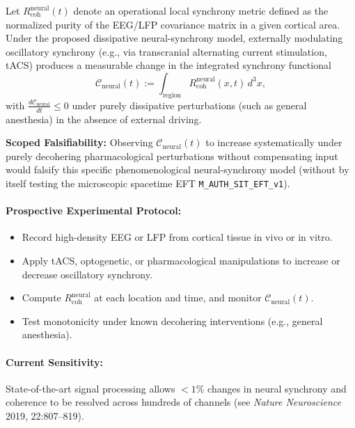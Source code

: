 \begin{prediction}
Let $R_{\mathrm{coh}}^{\mathrm{neural}}(t)$ denote an operational local synchrony metric defined as the normalized purity of the EEG/LFP covariance matrix in a given cortical area. Under the proposed dissipative neural-synchrony model, externally modulating oscillatory synchrony (e.g., via transcranial alternating current stimulation, tACS) produces a measurable change in the integrated synchrony functional
\[
\mathcal{C}_{\mathrm{neural}}(t) := \int_{\text{region}} R_{\mathrm{coh}}^{\mathrm{neural}}(x, t)\, d^3x,
\]
with $\frac{d \mathcal{C}_{\mathrm{neural}}}{dt} \leq 0$ under purely dissipative perturbations (such as general anesthesia) in the absence of external driving.

\textbf{Scoped Falsifiability:} Observing $\mathcal{C}_{\mathrm{neural}}(t)$ to increase systematically under purely decohering pharmacological perturbations without compensating input would falsify this specific phenomenological neural-synchrony model (without by itself testing the microscopic spacetime EFT \texttt{M\_AUTH\_SIT\_EFT\_v1}).
\end{prediction}

\paragraph{Prospective Experimental Protocol:}
\begin{itemize}
    \item Record high-density EEG or LFP from cortical tissue in vivo or in vitro.
    \item Apply tACS, optogenetic, or pharmacological manipulations to increase or decrease oscillatory synchrony.
    \item Compute $R_{\mathrm{coh}}^{\mathrm{neural}}$ at each location and time, and monitor $\mathcal{C}_{\mathrm{neural}}(t)$.
    \item Test monotonicity under known decohering interventions (e.g., general anesthesia).
\end{itemize}

\paragraph{Current Sensitivity:}
State-of-the-art signal processing allows $<1\%$ changes in neural synchrony and coherence to be resolved across hundreds of channels (see \textit{Nature Neuroscience} 2019, 22:807--819).

